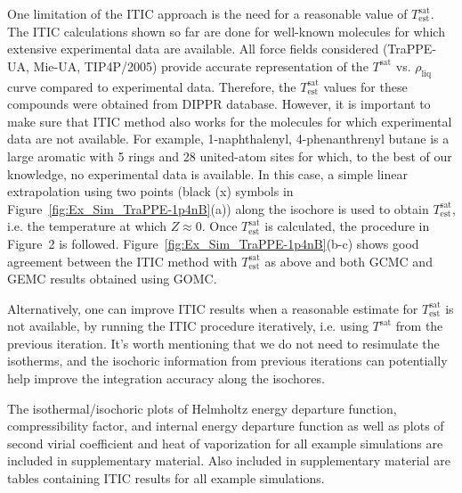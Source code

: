 \documentclass[5p,times]{elsarticle}
\begin{document}

One limitation of the ITIC approach is the need for a reasonable value of $T_\mathrm{est}^\mathrm{sat}$. The ITIC calculations shown so far are done for well-known molecules for which extensive experimental data are available. All force fields considered (TraPPE-UA, Mie-UA, TIP4P/2005) provide accurate representation of the $T^\mathrm{sat}$ vs. $\rho_\mathrm{liq}$ curve compared to experimental data. Therefore, the $T_\mathrm{est}^\mathrm{sat}$ values for these compounds were obtained from DIPPR database. However, it is important to make sure that ITIC method also works for the molecules for which experimental data are not available. For example, 1-naphthalenyl, 4-phenanthrenyl butane is a large aromatic with 5 rings and 28 united-atom sites for which, to the best of our knowledge, no experimental data is available. In this case, a simple linear extrapolation using two points (black (x) symbols in Figure~\ref{fig:Ex_Sim_TraPPE-1p4nB}(a)) along the isochore is used to obtain $T_\mathrm{est}^\mathrm{sat}$, i.e. the temperature at which $Z\approx0$. Once $T_\mathrm{est}^\mathrm{sat}$ is calculated, the procedure in Figure~2 is followed. Figure~\ref{fig:Ex_Sim_TraPPE-1p4nB}(b-c) shows good agreement between the ITIC method with $T_\mathrm{est}^\mathrm{sat}$ as above and both GCMC and GEMC results obtained using GOMC.

Alternatively, one can improve ITIC results when a reasonable estimate for $T_\mathrm{est}^\mathrm{sat}$ is not available, by running the ITIC procedure iteratively, i.e. using $T^\mathrm{sat}$ from the previous iteration. It's worth mentioning that we do not need to resimulate the isotherms, and the isochoric information from previous iterations can potentially help improve the integration accuracy along the isochores. 

The isothermal/isochoric plots of Helmholtz energy departure function, compressibility factor, and internal energy departure function as well as plots of second virial coefficient and heat of vaporization for all example simulations are included in supplementary material. Also included in supplementary material are tables containing ITIC results for all example simulations.
\end{document}
